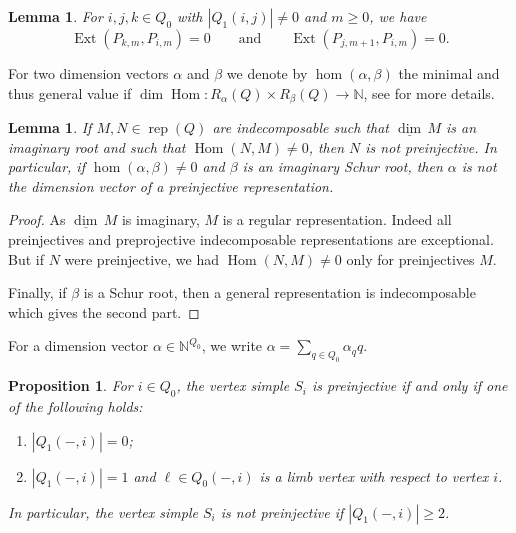 \documentclass{amsart}
\newtheorem{lemma}[theorem]{Lemma}
\newtheorem{proposition}[theorem]{Proposition}
\numberwithin{equation}{section}
\newcommand{\NN}{\mathbb{N}}
\newcommand\udim{{\underline{\dim}\, }}
\newcommand{\Ext}{\operatorname{Ext}}
\newcommand{\Hom}{\operatorname{Hom}}
\newcommand{\rep}{\operatorname{rep}}
\begin{document}
\begin{lemma}
  \label{le:preprojective ext groups}
  For $i,j,k\in Q_0$ with $|Q_1(i,j)|\ne0$ and $m\ge0$, we have 
  \[\Ext(P_{k,m},P_{i,m})=0 \qquad \text{and} \qquad \Ext(P_{j,m+1},P_{i,m})=0.\]
\end{lemma}
For two dimension vectors $\alpha$ and $\beta$ we denote by $\hom(\alpha,\beta)$ the minimal and thus general value if $\dim\Hom:R_\alpha(Q)\times R_\beta(Q)\to \NN$, see \cite{sch} for more details.
\begin{lemma}
  \label{lem: non-preinjective}
  If $M,N\in\rep(Q)$ are indecomposable such that $\udim M$ is an imaginary root and such that $\Hom(N,M)\neq 0$, then $N$ is not preinjective.
  In particular, if $\hom(\alpha,\beta)\neq 0$ and $\beta$ is an imaginary Schur root, then $\alpha$ is not the dimension vector of a preinjective representation.
\end{lemma}
\begin{proof}
  As $\udim M$ is imaginary, $M$ is a regular representation.
  Indeed all preinjectives and preprojective indecomposable representations are exceptional.
  But if $N$ were preinjective, we had $\Hom(N,M)\neq 0$ only for preinjectives $M$.

  Finally, if $\beta$ is a Schur root, then a general representation is indecomposable which gives the second part.
\end{proof}
For a dimension vector $\alpha\in\NN^{Q_0}$, we write $\alpha=\sum_{q\in Q_0}\alpha_q q$.
\begin{proposition}
  \label{pro:simpleregular}
  For $i\in Q_0$, the vertex simple $S_i$ is preinjective if and only if one of the following holds: 
  \begin{enumerate}
    \item $|Q_1(-,i)|=0$;
    \item $|Q_1(-,i)|=1$ and $\ell\in Q_0(-,i)$ is a limb vertex with respect to vertex $i$.
  \end{enumerate}
  In particular, the vertex simple $S_i$ is not preinjective if $|Q_1(-,i)|\geq 2$.			
\end{proposition}
\end{document}
